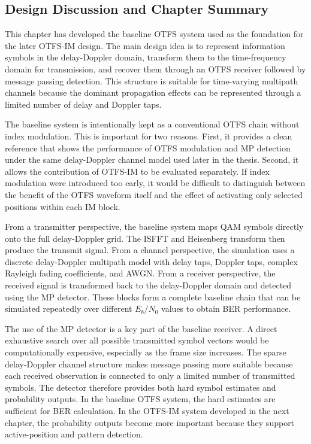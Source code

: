 \subsection{Design Discussion and Chapter Summary}

This chapter has developed the baseline OTFS system used as the foundation for the later OTFS-IM design. The main design idea is to represent information symbols in the delay-Doppler domain, transform them to the time-frequency domain for transmission, and recover them through an OTFS receiver followed by message passing detection. This structure is suitable for time-varying multipath channels because the dominant propagation effects can be represented through a limited number of delay and Doppler taps.

The baseline system is intentionally kept as a conventional OTFS chain without index modulation. This is important for two reasons. First, it provides a clean reference that shows the performance of OTFS modulation and MP detection under the same delay-Doppler channel model used later in the thesis. Second, it allows the contribution of OTFS-IM to be evaluated separately. If index modulation were introduced too early, it would be difficult to distinguish between the benefit of the OTFS waveform itself and the effect of activating only selected positions within each IM block.

From a transmitter perspective, the baseline system maps QAM symbols directly onto the full delay-Doppler grid. The ISFFT and Heisenberg transform then produce the transmit signal. From a channel perspective, the simulation uses a discrete delay-Doppler multipath model with delay taps, Doppler taps, complex Rayleigh fading coefficients, and AWGN. From a receiver perspective, the received signal is transformed back to the delay-Doppler domain and detected using the MP detector. These blocks form a complete baseline chain that can be simulated repeatedly over different \(E_b/N_0\) values to obtain BER performance.

The use of the MP detector is a key part of the baseline receiver. A direct exhaustive search over all possible transmitted symbol vectors would be computationally expensive, especially as the frame size increases. The sparse delay-Doppler channel structure makes message passing more suitable because each received observation is connected to only a limited number of transmitted symbols. The detector therefore provides both hard symbol estimates and probability outputs. In the baseline OTFS system, the hard estimates are sufficient for BER calculation. In the OTFS-IM system developed in the next chapter, the probability outputs become more important because they support active-position and pattern detection.

